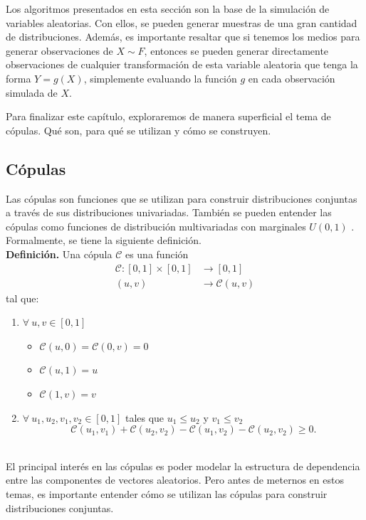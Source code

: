 \documentclass[11pt,a4paper]{article}
\newcommand{\C}{\mathcal{C}}
\begin{document}
Los algoritmos presentados en esta sección son la base de la simulación de variables aleatorias. Con ellos, se pueden generar muestras de una gran cantidad de distribuciones. Además, es importante resaltar que si tenemos los medios para generar observaciones de $X \sim F$, entonces se pueden generar directamente observaciones de cualquier transformación de esta variable aleatoria que tenga la forma $Y = g(X)$, simplemente evaluando la función $g$ en cada observación simulada de $X$.

Para finalizar este capítulo, exploraremos de manera superficial el tema de cópulas. Qué son, para qué se utilizan y cómo se construyen.\\

\subsection{Cópulas} \label{sec_copulas}

Las cópulas son funciones que se utilizan para construir distribuciones conjuntas a través de sus distribuciones univariadas. También se pueden entender las cópulas como funciones de distribución multivariadas con marginales $U(0, 1)$ \citep{nelsen}. Formalmente, se tiene la siguiente definición.\\

\textbf{Definición.} Una cópula $\C$ es una función 
\begin{align*}
\C: [0,1]\times[0,1]&\to [0,1]\\
(u,v) &\to \C(u,v)
\end{align*} tal que:
\begin{enumerate}
\item $\forall \ u,v \in [0,1]$
\begin{itemize}
\item $\C (u,0) = \C (0,v) = 0$
\item $\C(u,1) = u$
\item $\C(1, v) = v$
\end{itemize}
\item $\forall \ u_1, u_2, v_1, v_2 \in [0,1]$ tales que $u_1 \leq u_2$ y $v_1 \leq v_2$  $$\C (u_1,v_1)+\C (u_2,v_2) - \C(u_1,v_2) - \C(u_2,v_2)\geq 0.$$\\
\end{enumerate}

El principal interés en las cópulas es poder modelar la estructura de dependencia entre las componentes de vectores aleatorios. Pero antes de meternos en estos temas, es importante entender cómo se utilizan las cópulas para construir distribuciones conjuntas.\\ 
\end{document}
